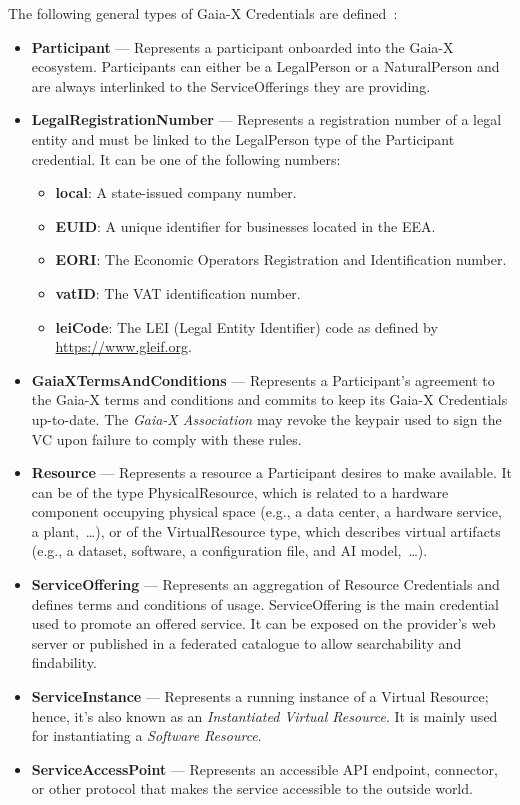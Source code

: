 The following general types of Gaia-X Credentials are defined~\cite{gaiax_architecture_document,gaiax_trust_framework}:
\begin{itemize}
    \item \textbf{Participant} --- Represents a participant onboarded into the Gaia-X ecosystem.
    Participants can either be a LegalPerson or a NaturalPerson and are always interlinked to the ServiceOfferings they are providing.
    \item \textbf{LegalRegistrationNumber} --- Represents a registration number of a legal entity and must be linked to the LegalPerson type of the Participant credential.
    It can be one of the following numbers:
    \begin{itemize}
        \item \textbf{local}: A state-issued company number.
        \item \textbf{EUID}: A unique identifier for businesses located in the EEA.
        \item \textbf{EORI}: The Economic Operators Registration and Identification number.
        \item \textbf{vatID}: The VAT identification number.
        \item \textbf{leiCode}: The LEI (Legal Entity Identifier) code as defined by \url{https://www.gleif.org}.
    \end{itemize}
    \item \textbf{GaiaXTermsAndConditions} --- Represents a Participant's agreement to the Gaia-X terms and conditions and commits to keep its Gaia-X Credentials up-to-date.
    The \textit{Gaia-X Association} may revoke the keypair used to sign the VC upon failure to comply with these rules.
    \item \textbf{Resource} --- Represents a resource a Participant desires to make available.
    It can be of the type PhysicalResource, which is related to a hardware component occupying physical space (e.g., a data center, a hardware service, a plant,~\ldots), or of the VirtualResource type, which describes virtual artifacts (e.g., a dataset, software, a configuration file, and AI model,~\ldots).
    \item \textbf{ServiceOffering} --- Represents an aggregation of Resource Credentials and defines terms and conditions of usage.
    ServiceOffering is the main credential used to promote an offered service.
    It can be exposed on the provider's web server or published in a federated catalogue to allow searchability and findability.
    \item \textbf{ServiceInstance} --- Represents a running instance of a Virtual Resource; hence, it's also known as an \textit{Instantiated Virtual Resource}.
    It is mainly used for instantiating a \textit{Software Resource}.
    \item \textbf{ServiceAccessPoint} --- Represents an accessible API endpoint, connector, or other protocol that makes the service accessible to the outside world.
\end{itemize}

